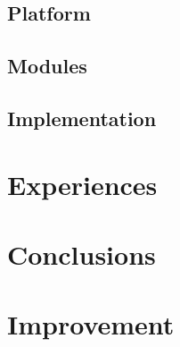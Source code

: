 \documentclass[paper=a4, fontsize=11pt]{scrartcl} %
\numberwithin{equation}{section} %
\numberwithin{figure}{section} %
\numberwithin{table}{section} %
\begin{document}
\subsection{Platform}

\subsection{Modules}

\subsection{Implementation}

\section{Experiences}

\section{Conclusions}

\section{Improvement}
\end{document}
